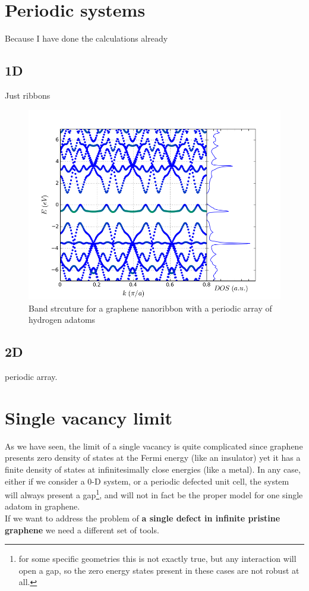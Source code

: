 \section{Periodic systems}
Because I have done the calculations already
\subsection{1D}
Just ribbons
\begin{figure}[h!]
  \centering
  \includegraphics{chapter05/figures/2dbands.png}
  \vspace{-5pt}
  \caption{Band strcuture for a graphene nanoribbon with a periodic array of hydrogen adatoms}
\end{figure}
\FloatBarrier
\subsection{2D}
periodic array.




\section{Single vacancy limit}
As we have seen, the limit of a single vacancy is quite complicated since graphene presents zero density of states at the Fermi energy (like an insulator) yet it has a finite density of states at infinitesimally close energies (like a metal). In any case, either if we consider a 0-D system, or a periodic defected unit cell, the system will always present a gap\footnote{for some specific geometries this is not exactly true, but any interaction will open a gap, so the zero energy states present in these cases are not robust at all.}, and will not in fact be the proper model for one single adatom in graphene.\\
If we want to address the problem of \textbf{a single defect in infinite pristine graphene} we need a different set of tools.

